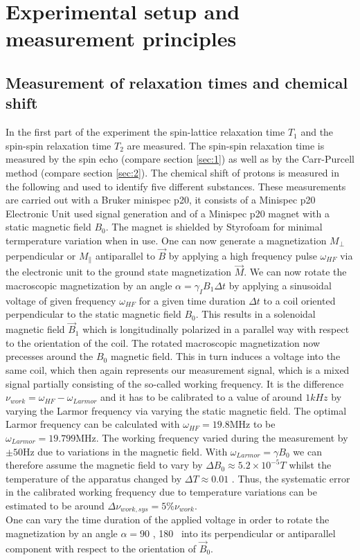 \section{Experimental setup and measurement principles}
\subsection{Measurement of relaxation times and chemical shift}
In the first part of the experiment the spin-lattice relaxation time $T_1$ and the spin-spin relaxation time $T_2$ are measured. The spin-spin relaxation time is measured by the spin echo (compare section \ref{sec:1}) as well as by the Carr-Purcell method (compare section \ref{sec:2}). The chemical shift of protons is measured in the following and used to identify five different substances. These measurements are carried out with a Bruker minispec p20, it consists of a Minispec p20 Electronic Unit used signal generation and of a Minispec p20 magnet with a static magnetic field $B_0$. The magnet is shielded by Styrofoam for minimal termperature variation when in use. One can now generate a magnetization $M_{\perp}$ perpendicular or  $M_{\parallel}$ antiparallel to $\vec{B}$ by applying a high frequency pulse $\omega_{HF}$ via the electronic unit to the ground state magnetization $\vec{M}$. We can now rotate the macroscopic magnetization by an angle $\alpha = \gamma_I B_1 \Delta t$ by applying a sinusoidal voltage of given frequency $\omega _{HF}$ for a given time duration $\Delta t$ to a coil oriented perpendicular to the static magnetic field $B_0$. This results in a solenoidal magnetic field $\vec{B}_1$ which is longitudinally polarized in a parallel way with respect to the orientation of the coil. The rotated macroscopic magnetization now precesses around the $B_0$ magnetic field. This in turn induces a voltage into the same coil, which then again represents our measurement signal, which is a mixed signal partially consisting of the so-called working frequency. It is the difference $\nu_{work}=\omega_{HF} - \omega_{Larmor}$ and it has to be calibrated to a value of around $1 kHz$ by varying the Larmor frequency via varying the static magnetic field. The optimal Larmor frequency can be calculated with $\omega_{HF} = 19.8 \mathrm{MHz}$ to be $\omega_{Larmor} = 19.799 \mathrm{MHz}$. The working frequency varied during the measurement by $\pm 50 \mathrm{Hz}$ due to variations in the magnetic field. With $\omega_{Larmor} = \gamma B_0$ we can therefore assume the magnetic field to vary by $\Delta B_0 \approx 5.2\times10^{-5} T$ whilst the temperature of the apparatus changed by $\Delta T \approx 0.01$ \textcelsius. Thus, the systematic error in the calibrated working frequency due to temperature variations can be estimated to be around $\Delta \nu_{work,sys} = 5 \% \nu_{work}$.\\
One can vary the time duration of the applied voltage in order to rotate the magnetization by an angle $\alpha = 90$ \textdegree, 180 \textdegree \, into its perpendicular or antiparallel component with respect to the orientation of $\vec{B} _0$.\cite{manual}


